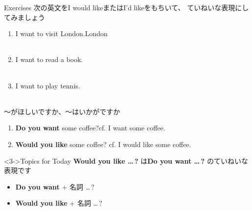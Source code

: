 \documentclass[aspectratio=169,xcolor={dvipsnames,table}]{beamer}
\begin{document}
\begin{frame}[plain]{Exercises}
次の英文をI would likeまたはI'd likeをもちいて、 ていねいな表現にしてみましょう
 \begin{enumerate}
  \item I want to visit London.\hfill{\scriptsize London }\\
\\
  \item I want to read a book.\\
\\
  \item I want to play tennis.\\
\\
 \end{enumerate}
\hfill{\scriptsize {}}

\end{frame}
\begin{frame}[plain]{～がほしいですか、～はいかがですか}
\large
 \begin{enumerate}
  \item<1-> \textbf{Do you want} some coffee?\hfill{\scriptsize cf. I want some coffee.}
  \item<2-> \textbf{Would you like} some coffee? \hfill{\scriptsize cf. I would like some coffee.}
 \end{enumerate}

\bigskip

\begin{block}<3->{Topics for Today}\small
\textbf{Would you like \ldots\,?}\,\,は\textbf{Do you want \ldots\,?}\,\,のていねいな表現です
\begin{itemize}[square]\small
 \item \textbf{Do you want} $+$ 名詞 \ldots\,?
 \item \textbf{Would you like} $+$ 名詞 \ldots\,?
       \end{itemize}
\end{block}
\hfill{\scriptsize {}}

\end{frame}
\end{document}
